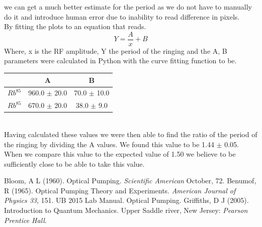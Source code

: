 \documentclass[twocolumn]{article}
\begin{document}
we can get a much better estimate for the period as we do not have to manually 
do it and introduce human error due to inability to read difference in pixels.
\\
By fitting the plots to an equation that reads.
\begin{equation}
Y = \frac{A}{x} + B
\label{eqn:23}
\end{equation}
Where, x is the RF amplitude, Y the period of the ringing and the A, B 
parameters were calculated in Python with the curve fitting function to be.
\begin{minipage}{\linewidth}
\center
\begin{tabular}{|c|c|c|}
\hline
{} & A & B \\ \hline
$Rb^{85}$ & 960.0 $\pm$ 20.0 & 70.0 $\pm$ 10.0 \\ \hline
$Rb^{85}$ & 670.0 $\pm$ 20.0 & 38.0 $\pm$ 9.0 \\ \hline
\end{tabular}
\label{tbl:13}
\end{minipage}
\\
Having calculated these values we were then able to find the ratio of the 
period of the ringing by dividing the A values. We found this value to be 1.44 
$\pm$ 0.05.
\\
When we compare this value to the expected value of 1.50 we believe to be 
sufficiently close to be able to take this value.



\begin{thebibliography}{9}
Bloom, A L (1960). Optical Pumping. \emph{Scientific American} October, 72.
Benumof, R (1965). Optical Pumping Theory and Experiments. \emph{American 
Journal of Physics 33}, 151.
UB 2015 Lab Manual. Optical Pumping.
Griffiths, D J (2005). Introduction to Quantum Mechanics. Upper Saddle river, 
New Jersey: \emph{Pearson Prentice Hall}.

\end{thebibliography}
\end{document}
